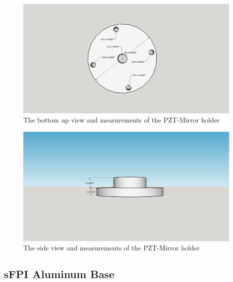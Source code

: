 \documentclass[12pt,journal]{IEEEtran}
\begin{document}
\begin{appendices}
\begin{figure}[h!]
  \centering
	\includegraphics[width=\textwidth]{./mechanical/PZT_holder_bottom.png}
	\caption[Cavity Mounts]{The bottom up view and measurements of the PZT-Mirror holder}
	\label{fig:PZT-holder-bottom}
\end{figure}  

\begin{figure}[h!]
  \centering
	\includegraphics[width=\textwidth]{./mechanical/PZT_holder_side.png}
	\caption[Cavity Mounts]{The side view and measurements of the PZT-Mirror holder}
	\label{fig:PZT-holder-side}
\end{figure}  

\newpage

\subsection{sFPI Aluminum Base} \label{ss:sfpilensholder}


\end{appendices}
\end{document}
